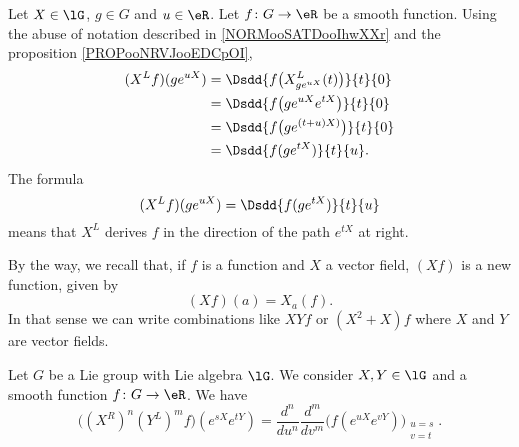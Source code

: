 \begin{normaltext}
    Let \( X\in \lG\), \( g\in G\) and \( u\in \eR\). Let \( f\colon G\to \eR\) be a smooth function. Using the abuse of notation described in \ref{NORMooSATDooIhwXXr} and the proposition \ref{PROPooNRVJooEDCpOI},
    \begin{subequations}
        \begin{align}
            (X^Lf)(g e^{uX})&=\Dsdd{ f\big( X^L_{g e^{uX}}(t) \big) }{t}{0}\\
            &=\Dsdd{ f\big( g e^{uX} e^{tX} \big) }{t}{0}\\
            &=\Dsdd{ f\big( g e^{(t+u)X)} \big)}{t}{0}\\
            &=\Dsdd{ f(g e^{tX}) }{t}{u}.
        \end{align}
    \end{subequations}
    The formula
    \begin{equation}
        (X^Lf)(g e^{uX})=\Dsdd{ f(g e^{tX}) }{t}{u}
    \end{equation}
    means that \( X^L\) derives \( f\) in the direction of the path \(  e^{tX}\) at right.
\end{normaltext}

\begin{normaltext}
    By the way, we recall that, if \( f\) is a function and \( X\) a vector field, \( (Xf)\) is a new function, given by
    \begin{equation}
        (Xf)(a)=X_a(f).
    \end{equation}
    In that sense we can write combinations like \( XYf\) or \( (X^2+X)f\) where \( X\) and \( Y\) are vector fields.
\end{normaltext}

\begin{proposition}       \label{PROPooKSIDooVIFkiM}
    Let \( G\) be a Lie group with Lie algebra \( \lG\). We consider \( X,Y\in \lG\) and a smooth function \( f\colon G\to \eR\). We have
    \begin{equation}
        \big( (X^R)^n(Y^L)^mf \big)( e^{sX} e^{tY})=\frac{ d^n }{ du^n }\frac{ d^m }{ dv^m }\Big( f( e^{uX} e^{vY}) \Big)_{\substack{u=s\\v=t}}.
    \end{equation}
\end{proposition}

